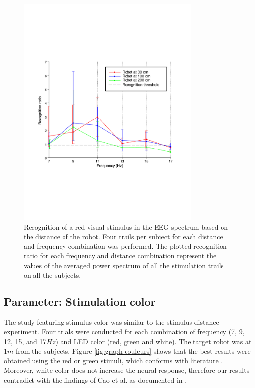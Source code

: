 \documentclass{svmult}
\begin{document}
\begin{figure}
\center
\includegraphics[width=0.8\textwidth]{figures/graph-distances.pdf}
\caption{Recognition of a red visual stimulus in the EEG spectrum based on the distance of the robot. Four trails per subject for each distance and frequency combination was performed. The plotted recognition ratio for each frequency and distance combination represent the values of the averaged power spectrum of all the stimulation trails on all the subjects.}
\label{fig:graph-distances}
\end{figure}
\subsection{Parameter: Stimulation color}
The study featuring stimulus color was similar to the stimulus-distance experiment. Four trials were conducted for each combination of frequency (7, 9, 12, 15, and 17$Hz$) and LED color (red, green and white). The target robot was at 1$m$ from the subjects. Figure \ref{fig:graph-couleurs} shows that the best results were obtained using the red or green stimuli, which conforms with literature \cite{chua2004effects, duvinage2013performance, paper_5, hvaring2014comparison}. Moreover, white color does not increase the neural response, therefore our results contradict with the findings of Cao et al. as documented in \cite{cao2012flashing}. 
\end{document}
